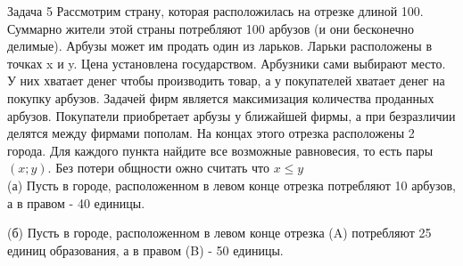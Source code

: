 \begin{mybox}{Задача 5}
    \indent\setlength{\parindent}{1em}\indent\setlength{\parindent}{1em}Рассмотрим страну, которая расположилась на
    отрезке длиной 100. Суммарно жители этой страны потребляют 100 арбузов (и они бесконечно делимые).
    Арбузы может им продать один из ларьков. Ларьки расположены в точках x и y. Цена установлена государством.
    Арбузники
    сами выбирают место. У
    них
    хватает денег чтобы производить товар, а у покупателей хватает денег на покупку арбузов. Задачей фирм является
    максимизация количества проданных арбузов. Покупатели приобретает
    арбузы у ближайшей фирмы, а при безразличии делятся между фирмами пополам.
    На концах этого
    отрезка
    расположены 2 города. Для каждого пункта найдите все возможные равновесия, то есть пары $(x;y)$. Без потери
    общности ожно считать что $x\leq y$\\
    \indent\setlength{\parindent}{1em}(а) Пусть в городе, расположенном в левом конце отрезка потребляют 10 арбузов,
    а в правом - 40 единицы.
    \begin{center}
    \end{center}
    \indent\setlength{\parindent}{1em}(б) Пусть в городе, расположенном в левом конце отрезка (A) потребляют 25 единиц
    образования, а в правом (B) - 50 единицы.
    \begin{center}
        \begin{tikzpicture}



\end{tikzpicture}
\end{center}
\end{mybox}
